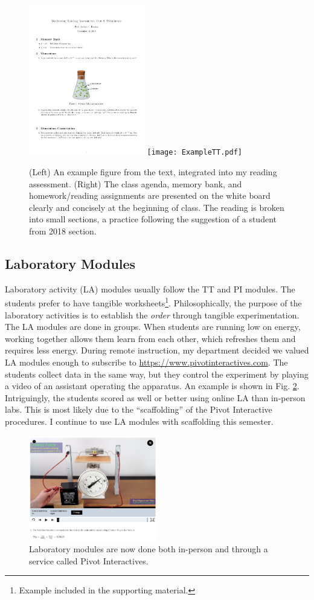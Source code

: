 \documentclass[../../../main.tex]{subfiles}
\begin{document}
\begin{figure}
\centering
\includegraphics[width=0.45\textwidth]{figures/readingassessment.png}
\texttt{[image: ExampleTT.pdf]}
\caption{\label{fig:read} (Left) An example figure from the text, integrated into my reading assessment.  (Right) The class agenda, memory bank, and homework/reading assignments are presented on the white board clearly and concisely at the beginning of class.  The reading is broken into small sections, a practice following the suggestion of a student from 2018 section.}
\end{figure}

\subsection{Laboratory Modules}
\label{sec:la}

Laboratory activity (LA) modules usually follow the TT and PI modules.  The students prefer to have tangible worksheets\footnote{Example included in the supporting material.}.  Philosophically, the purpose of the laboratory activities is to establish the \textit{order} through tangible experimentation.  The LA modules are done in groups.  When students are running low on energy, working together allows them learn from each other, which refreshes them and requires less energy.  During remote instruction, my department decided we valued LA modules enough to subscribe to \url{https://www.pivotinteractives.com}.  The students collect data in the same way, but they control the experiment by playing a video of an assistant operating the apparatus.  An example is shown in Fig. \ref{fig:pivot}.  Intriguingly, the students scored as well or better using online LA than in-person labs.  This is most likely due to the ``scaffolding'' of the Pivot Interactive procedures.  I continue to use LA modules with scaffolding this semester.

\begin{figure}
\centering
\includegraphics[width=0.5\textwidth]{figures/pivot.png}
\caption{\label{fig:pivot}  Laboratory modules are now done both in-person and through a service called Pivot Interactives.}
\end{figure}
\end{document}
